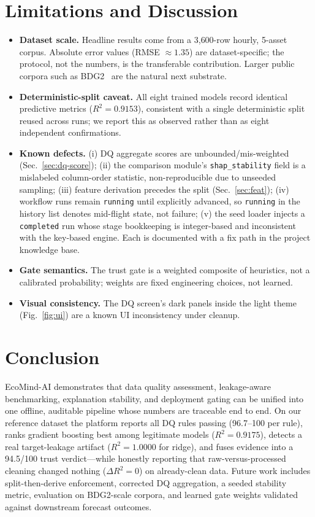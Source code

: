 \documentclass[conference]{IEEEtran}
\begin{document}
\section{Limitations and Discussion}\label{sec:limits}
\begin{itemize}
\item \textbf{Dataset scale.} Headline results come from a 3{,}600-row hourly, 5-asset corpus. Absolute error values (RMSE $\approx 1.35$) are dataset-specific; the protocol, not the numbers, is the transferable contribution. Larger public corpora such as BDG2~\cite{miller:2020} are the natural next substrate.
\item \textbf{Deterministic-split caveat.} All eight trained models record identical predictive metrics ($R^2=0.9153$), consistent with a single deterministic split reused across runs; we report this as observed rather than as eight independent confirmations.
\item \textbf{Known defects.} (i) DQ aggregate scores are unbounded/mis-weighted (Sec.~\ref{sec:dq-score}); (ii) the comparison module's \texttt{shap\_stability} field is a mislabeled column-order statistic, non-reproducible due to unseeded sampling; (iii) feature derivation precedes the split (Sec.~\ref{sec:feat}); (iv) workflow runs remain \texttt{running} until explicitly advanced, so \texttt{running} in the history list denotes mid-flight state, not failure; (v) the seed loader injects a \texttt{completed} run whose stage bookkeeping is integer-based and inconsistent with the key-based engine. Each is documented with a fix path in the project knowledge base.
\item \textbf{Gate semantics.} The trust gate is a weighted composite of heuristics, not a calibrated probability; weights are fixed engineering choices, not learned.
\item \textbf{Visual consistency.} The DQ screen's dark panels inside the light theme (Fig.~\ref{fig:ui}) are a known UI inconsistency under cleanup.
\end{itemize}

\section{Conclusion}

EcoMind-AI demonstrates that data quality assessment, leakage-aware benchmarking, explanation stability, and deployment gating can be unified into one offline, auditable pipeline whose numbers are traceable end to end. On our reference dataset the platform reports all DQ rules passing (96.7--100 per rule), ranks gradient boosting best among legitimate models ($R^2=0.9175$), detects a real target-leakage artifact ($R^2=1.0000$ for ridge), and fuses evidence into a 94.5/100 trust verdict---while honestly reporting that raw-versus-processed cleaning changed nothing ($\Delta R^2=0$) on already-clean data. Future work includes split-then-derive enforcement, corrected DQ aggregation, a seeded stability metric, evaluation on BDG2-scale corpora, and learned gate weights validated against downstream forecast outcomes.
\end{document}

